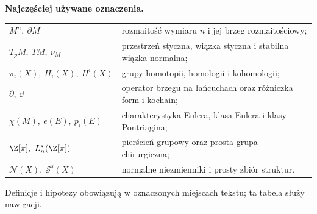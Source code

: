 \noindent\textbf{Najczęściej używane oznaczenia.}
\begin{center}
\begin{tabular}{p{3.9cm}p{9.7cm}}
$M^n,\ \partial M$ & rozmaitość wymiaru $n$ i jej brzeg rozmaitościowy;\\
$T_pM,\ TM,\ \nu_M$ & przestrzeń styczna, wiązka styczna i stabilna wiązka normalna;\\
$\pi_i(X),\ H_i(X),\ H^i(X)$ & grupy homotopii, homologii i kohomologii;\\
$\partial,\ \dd$ & operator brzegu na łańcuchach oraz różniczka form i kochain;\\
$\chi(M),\ e(E),\ p_i(E)$ & charakterystyka Eulera, klasa Eulera i klasy Pontriagina;\\
$\Z[\pi],\ L_n^s(\Z[\pi])$ & pierścień grupowy oraz prosta grupa chirurgiczna;\\
$\mathcal N(X),\ \mathcal S^s(X)$ & normalne niezmienniki i prosty zbiór struktur.
\end{tabular}
\end{center}
Definicje i hipotezy obowiązują w oznaczonych
miejscach tekstu; ta tabela służy nawigacji.

\clearpage
